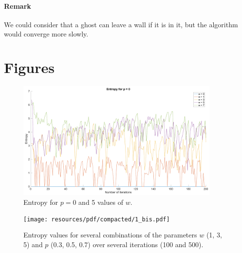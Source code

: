 \documentclass[a4paper, 12pt]{article}
\begin{document}
    \paragraph{Remark} We could consider that a ghost can leave a wall if it is in it, but the algorithm would converge more slowly.
    
    
    \appendix
    \section{Figures}
    \label{sec:figures}
    \begin{figure}[!ht]
        \centering
        \includegraphics[width=0.9\textwidth]{resources/pdf/200/p0.pdf}
        \caption{Entropy for \(p = 0\) and \num{5} values of \(w\).}
        \label{fig:200_p0}
    \end{figure}
    \begin{figure}[!ht]
        \centering
        \texttt{[image: resources/pdf/compacted/1\_bis.pdf]}
        \caption{Entropy values for several combinations of the parameters \(w\) (\num{1}, \num{3}, \num{5}) and \(p\) (\num{0.3}, \num{0.5}, \num{0.7}) over several iterations (\num{100} and \num{500}).}
    \end{figure}
\end{document}
